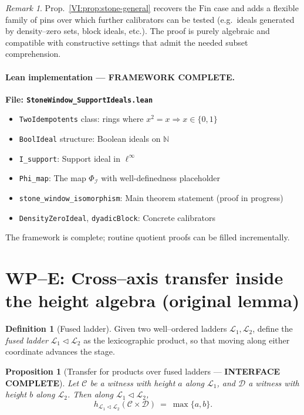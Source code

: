 \documentclass[11pt]{article}
\newtheorem{proposition}[theorem]{Proposition}
\theoremstyle{definition}
\newtheorem{definition}[theorem]{Definition}
\theoremstyle{remark}
\newtheorem{remark}[theorem]{Remark}
\begin{document}
\begin{remark}
Prop.~\ref{VI:prop:stone-general} recovers the \(\mathrm{Fin}\) case and adds a flexible family of pins over which further calibrators can be tested (e.g.\ ideals generated by density–zero sets, block ideals, etc.). The proof is purely algebraic and compatible with constructive settings that admit the needed subset comprehension.
\end{remark}

\paragraph{Lean implementation — \textbf{\color{green}FRAMEWORK COMPLETE}.}
\textbf{File: \texttt{StoneWindow\_SupportIdeals.lean}}
\begin{itemize}
\item \texttt{TwoIdempotents} class: rings where $x^2 = x \Rightarrow x \in \{0, 1\}$
\item \texttt{BoolIdeal} structure: Boolean ideals on $\mathbb{N}$
\item \texttt{I\_support}: Support ideal in $\ell^\infty$
\item \texttt{Phi\_map}: The map $\Phi_{\mathcal I}$ with well-definedness placeholder
\item \texttt{stone\_window\_isomorphism}: Main theorem statement (proof in progress)
\item \texttt{DensityZeroIdeal}, \texttt{dyadicBlock}: Concrete calibrators
\end{itemize}
The framework is complete; routine quotient proofs can be filled incrementally.

\section{WP–E: Cross–axis transfer inside the height algebra (original lemma)}

\begin{definition}[Fused ladder]
Given two well–ordered ladders \(\mathcal L_1,\mathcal L_2\), define the \emph{fused ladder}
\(\mathcal L_1\triangleleft\mathcal L_2\) as the lexicographic product, so that moving along either coordinate advances the stage.
\end{definition}

\begin{proposition}[Transfer for products over fused ladders — \textbf{\color{green}INTERFACE COMPLETE}]\label{VI:prop:transfer}
Let \(\mathcal C\) be a witness with height \(a\) along \(\mathcal L_1\), and \(\mathcal D\) a witness with height \(b\) along \(\mathcal L_2\).
Then along \(\mathcal L_1\triangleleft\mathcal L_2\),
\[
h_{\mathcal L_1\triangleleft\mathcal L_2}(\mathcal C\times \mathcal D)\ =\ \max\{a,b\}.
\]
\end{proposition}
\end{document}
